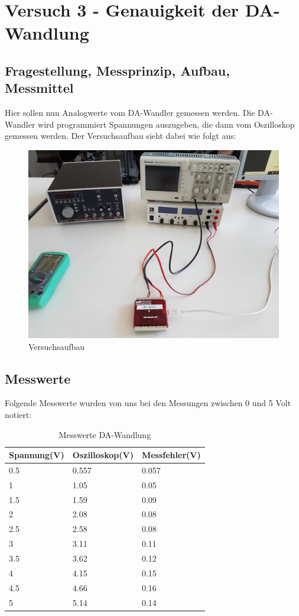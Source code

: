 \documentclass[12pt, oneside, a4paper, \docLanguage]{report}
\begin{document}
%
%
\chapter{Versuch 3 - Genauigkeit der DA-Wandlung}
\label{chap:VERSUCH_3}

\section{Fragestellung, Messprinzip, Aufbau, Messmittel}
\label{chap:VERSUCH_3_FRAGESTELLUNG}
Hier sollen nun Analogwerte vom DA-Wandler gemessen werden.
Die DA-Wandler wird programmiert Spannungen auszugeben, die dann vom Oszilloskop gemessen werden.
Der Versuchsaufbau sieht dabei wie folgt aus:
\begin{figure}[H]
	\centering\small
	\graphicspath{ {../versuch5/} }
	\includegraphics[width=.65\textwidth]{media/versuch3}
	\caption{Versuchsaufbau}
	\label{fig:V3}
\end{figure}
\section{Messwerte}
\label{chap:VERSUCH_3_MESSWERTE}
Folgende Messwerte wurden von uns bei den Messungen zwischen 0 und 5 Volt notiert:

\begin{table}[H]
	\centering
	\begin{tabular}{l|l|l}
		Spannung(V) & Oszilloskop(V) & Messfehler(V)\\
		\hline
		0.5 & 0.557 & 0.057\\
		1 & 1.05 & 0.05\\
		1.5 & 1.59 & 0.09\\
		2 & 2.08 & 0.08\\
		2.5 & 2.58 & 0.08\\
		3 & 3.11 & 0.11\\
		3.5 & 3.62 & 0.12\\
		4 & 4.15 & 0.15\\
		4.5 & 4.66 & 0.16\\
		5 & 5.14 & 0.14
	\end{tabular}
	\caption{Messwerte DA-Wandlung}
	\label{MWDAWANDLUNG}
\end{table}
\end{document}
